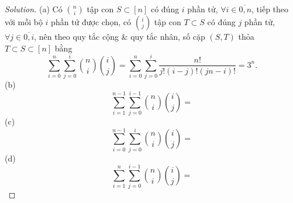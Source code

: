 \documentclass{article}
\begin{document}
\begin{proof}[Solution]
    (a) Có $\binom{n}{i}$ tập con $S\subset[n]$ có đúng $i$ phần tử, $\forall i\in\overline{0,n}$, tiếp theo với mỗi bộ $i$ phần tử được chọn, có $\binom{i}{j}$ tập con $T\subset S$ có đúng $j$ phần tử, $\forall j\in\overline{0,i}$, nên theo quy tắc cộng \& quy tắc nhân, số cặp $(S,T)$ thỏa $T\subset S\subset[n]$ bằng
    \begin{equation*}
        \sum_{i=0}^n\sum_{j=0}^i \binom{n}{i}\binom{i}{j} = \sum_{i=0}^n\sum_{j=0}^i \frac{n!}{j!(i - j)!(jn - i)!} = 3^n.
    \end{equation*}
    (b)
    \begin{equation*}
        \sum_{i=1}^{n-1}\sum_{j=0}^{i-1} \binom{n}{i}\binom{i}{j} =
    \end{equation*}
    (c)
    \begin{equation*}
        \sum_{i=0}^{n-1}\sum_{j=0}^i \binom{n}{i}\binom{i}{j} =
    \end{equation*}
    (d)
    \begin{equation*}
        \sum_{i=1}^n\sum_{j=0}^{i-1} \binom{n}{i}\binom{i}{j} =
    \end{equation*}
\end{proof}
\end{document}
